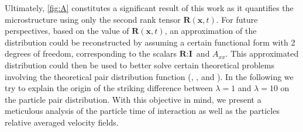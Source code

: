 Ultimately, \ref{fig:A} constitutes a significant result of this work as it quantifies the microstructure using only the second rank tensor $\textbf{R}(\textbf{x},t)$.
For future perspectives, based on the value of $\textbf{R}(\textbf{x},t)$, an approximation of the distribution could be reconstructed by assuming a certain functional form with 2 degrees of freedom, corresponding to the scalars $\textbf{R}:\textbf{I}$ and $A_{xx}$.
This approximated distribution could then be used to better solve certain theoretical problems involving the theoretical pair distribution function (\citet{batchelor1972sedimentation}, \citet{hinch1977averaged}, and \citet{zhang2021ensemble}).
In the following we try to explain the origin of the striking difference between $\lambda = 1$ and $\lambda = 10$ on the particle pair distribution.
With this objective in mind, we present a meticulous analysis of the particle time of interaction as well as the particles relative averaged velocity fields. 
